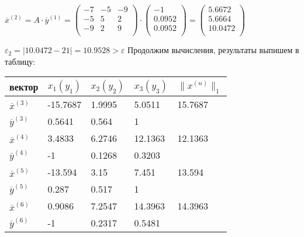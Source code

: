 \documentclass[10pt, a4paper]{scrartcl}
\begin{document}
\(\displaystyle \overline{x}^{(2)} = A \cdot \overline{y}^{(1)} = \begin{pmatrix} -7 & -5 & -9\\ -5 & 5 & 2\\ -9 & 2 & 9\\ \end{pmatrix}\cdot\begin{pmatrix} -1\\ 0.0952\\ 0.0952\\ \end{pmatrix} = \begin{pmatrix} 5.6672\\ 5.6664\\ 10.0472\\ \end{pmatrix}\)

\(\displaystyle \varepsilon_2 = |10.0472 - 21| = 10.9528 > \varepsilon\)
Продолжим вычисления, результаты выпишем в таблицу:

\vspace{5mm}\begin{center}
\begin{tabular}{ | l  | l  | l  | l  | l |}
\hline
вектор & $x_1(y_1)$ & $x_2(y_2)$ & $x_3(y_3)$ & $\parallel x^{(n)} \parallel _1$ \\ \hline
$\overline{x}^{(3)}$ & -15.7687 & 1.9995 & 5.0511 & 15.7687 \\ \hline
$\overline{y}^{(3)}$ & 0.5641 & 0.564 & 1 &   \\ \hline
$\overline{x}^{(4)}$ & 3.4833 & 6.2746 & 12.1363 & 12.1363 \\ \hline
$\overline{y}^{(4)}$ & -1 & 0.1268 & 0.3203 &   \\ \hline
$\overline{x}^{(5)}$ & -13.594 & 3.15 & 7.451 & 13.594 \\ \hline
$\overline{y}^{(5)}$ & 0.287 & 0.517 & 1 &   \\ \hline
$\overline{x}^{(6)}$ & 0.9086 & 7.2547 & 14.3963 & 14.3963 \\ \hline
$\overline{y}^{(6)}$ & -1 & 0.2317 & 0.5481 &   \\ \hline
\end{tabular}
\end{center}

\pagebreak
\end{document}
